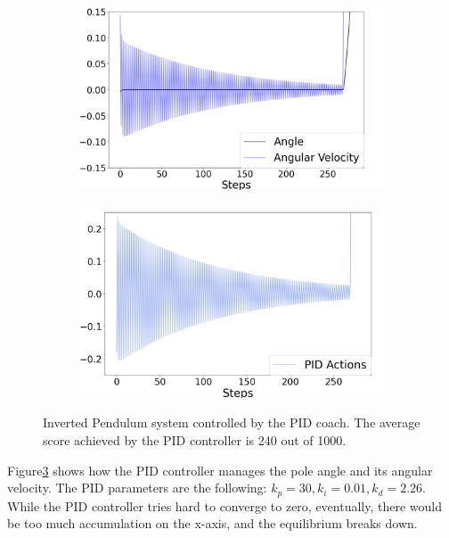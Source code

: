 \documentclass{IJCAS}
\begin{document}
\begin{figure}
\centering
\begin{subfigure}{0.25\textwidth}
\centering
\includegraphics[width=\linewidth]{ip_PID.png}
\label{fig:ip_pid}
\end{subfigure}%
\begin{subfigure}{.25\textwidth}
\centering
\includegraphics[width=\linewidth]{ip_PID_actions.png}
\label{fig:ip_pid_actions}
\end{subfigure}
\caption{Inverted Pendulum system controlled by the PID coach. The average score achieved by the PID controller is 240 out of 1000.}
\label{fig:ip}
\end{figure}


Figure\ref{fig:ip} shows how the PID controller manages the pole angle and its angular velocity. The PID parameters are the following: $k_p=30,k_i=0.01,k_d=2.26$. While the PID controller tries hard to converge to zero, eventually, there would be too much accumulation on the x-axis, and the equilibrium breaks down.
\end{document}
